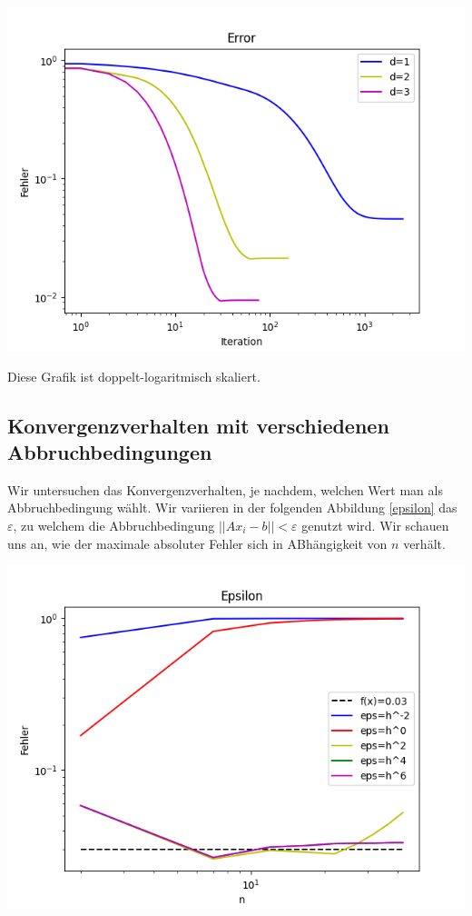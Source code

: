 \documentclass[smallheadings]{scrartcl}
\theoremstyle{definition}
\begin{document}
\begin{minipage}{\textwidth}

 \centering
 \includegraphics[scale = 0.9]{Error1}
 	\label{error}

 \end{minipage}
 
 Diese Grafik ist doppelt-logaritmisch skaliert. 


\subsection{Konvergenzverhalten mit verschiedenen Abbruchbedingungen}
Wir untersuchen das Konvergenzverhalten, je nachdem, welchen Wert man als Abbruchbedingung wählt.  Wir variieren in der folgenden Abbildung \ref{epsilon} das $\varepsilon$,  zu welchem die Abbruchbedingung $||Ax_i -b||<\varepsilon$ genutzt wird. Wir schauen uns an, wie der maximale absoluter Fehler sich in ABhängigkeit von $n$ verhält. 


\begin{minipage}{\textwidth}

 \centering
 \includegraphics[scale = 0.9]{epsilon1}
 	\label{epsilon}

 \end{minipage}
 
\end{document}
